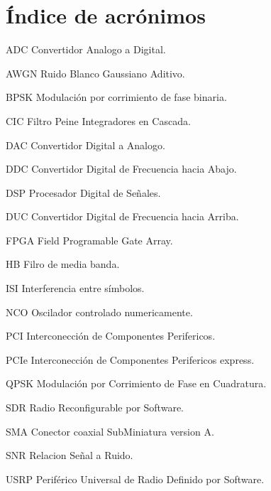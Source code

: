 \chapter*{\'Indice de acr\'onimos}
%

\begin{symbollist*}

\item[ADC]  Convertidor Analogo a Digital.
\item[AWGN] Ruido Blanco Gaussiano Aditivo.
\item[BPSK] Modulaci\'on por corrimiento de fase binaria.
\item[CIC]  Filtro Peine Integradores en Cascada.
\item[DAC]  Convertidor Digital a Analogo.
\item[DDC]  Convertidor Digital de Frecuencia hacia Abajo.
\item[DSP]  Procesador Digital de Se\~nales.
\item[DUC]  Convertidor Digital de Frecuencia hacia Arriba.
\item[FPGA] Field Programable Gate Array.
\item[HB]   Filro de media banda.
\item[ISI]  Interferencia entre s\'imbolos.
\item[NCO]  Oscilador controlado numericamente.
\item[PCI]  Interconecci\'on de Componentes Perifericos.
\item[PCIe] Interconecci\'on de Componentes Perifericos express.
\item[QPSK] Modulaci\'on por Corrimiento de Fase en Cuadratura.
\item[SDR]  Radio Reconfigurable por Software.
\item[SMA]  Conector coaxial SubMiniatura version A.
\item[SNR]  Relacion Se\~nal a Ruido.
\item[USRP] Perif\'erico Universal de Radio Definido por Software.

\end{symbollist*}